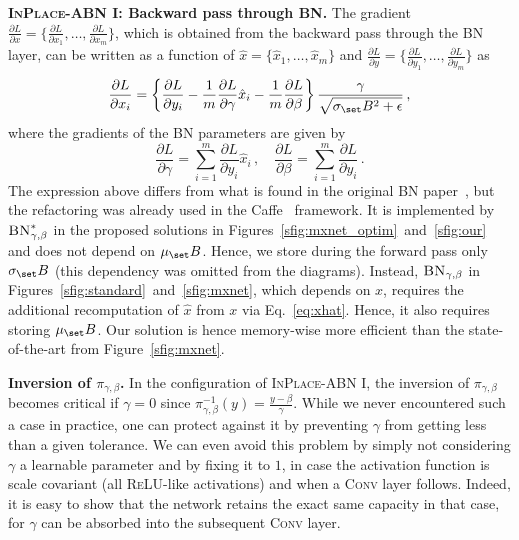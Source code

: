 \documentclass[10pt,twocolumn,letterpaper]{article}
\newcommand{\bnInplace}{\textsc{InPlace-ABN}\xspace}
\newcommand{\myparagraph}[1]{\vspace{5pt}\noindent\textbf{#1}}
\begin{document}
\myparagraph{\bnInplace I: Backward pass through \textsc{BN}.} The gradient $\frac{\partial L}{\partial x}=\{\frac{\partial L}{\partial x_1},\dots,\frac{\partial L}{\partial x_m} \}$, which is obtained from the backward pass through the \textsc{BN} layer, can be written as a function of $\hat x=\{\hat x_1,\dots,\hat x_m\}$ and $\frac{\partial L}{\partial y}=\{\frac{\partial L}{\partial y_1},\dots,\frac{\partial L}{\partial y_m} \}$ as 
\[
	\frac{\partial L}{\partial x_i}=\left\{\frac{\partial L}{\partial y_i}-\frac{1}{m}\frac{\partial L}{\partial \gamma}\hat x_i-\frac{1}{m}\frac{\partial L}{\partial\beta}\right\}\frac{\gamma}{\sqrt{\sigma_\set B^2+\epsilon}}\,,
\]
where the gradients of the \textsc{BN} parameters are given by
\[
	\frac{\partial L}{\partial\gamma}=\sum_{i=1}^m\frac{\partial L}{\partial y_i}\hat x_i\,,\quad\frac{\partial L}{\partial \beta}=\sum_{i=1}^m\frac{\partial L}{\partial y_i}\,.
\]
The expression above differs from what is found in the original \textsc{BN} paper~\cite{IofSze15}, but the refactoring was already used in the Caffe~\cite{Jia2014} framework.
It is implemented by $\textsc{BN}_{\gamma,\beta}^*$ in the proposed solutions in Figures~\ref{sfig:mxnet_optim}~and~\ref{sfig:our} and does not depend on $\mu_\set B$. Hence, we store during the forward pass only $\sigma_\set B$ (this dependency was omitted from the diagrams).
Instead, $\textsc{BN}_{\gamma,\beta}$ in Figures~\ref{sfig:standard}~and~\ref{sfig:mxnet}, which depends on $x$, requires the additional recomputation of $\hat x$ from $x$ via Eq.~\eqref{eq:xhat}. Hence, it also requires storing $\mu_\set B$. Our solution is hence memory-wise more efficient than the state-of-the-art from Figure~\ref{sfig:mxnet}.

\myparagraph{Inversion of \boldmath$\pi_{\gamma,\beta}$.} In the configuration of \bnInplace I, the inversion of $\pi_{\gamma,\beta}$ becomes critical if $\gamma=0$ since $\pi^{-1}_{\gamma,\beta}(y)=\frac{y-\beta}{\gamma}$. While we never encountered such a case in practice, one can protect against it by preventing $\gamma$ from getting less than a given tolerance. We can even avoid this problem by simply not considering $\gamma$ a learnable parameter and by fixing it to $1$, in case the activation function is scale covariant (\eg all \textsc{ReLU}-like activations) and when a \textsc{Conv} layer follows. Indeed, it is easy to show that the network retains the exact same capacity in that case, for $\gamma$ can be absorbed into the subsequent \textsc{Conv} layer. 
\end{document}
